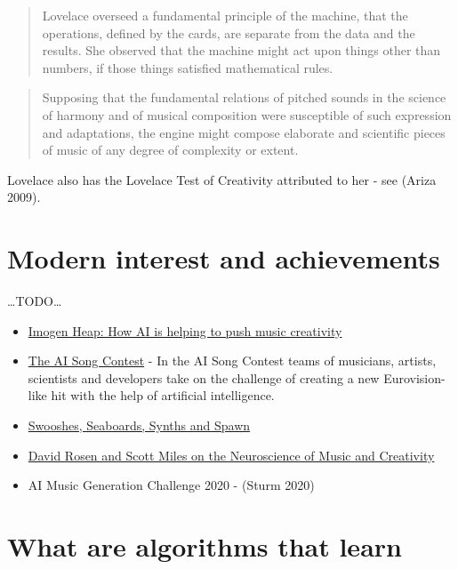 \documentclass[12pt,a4paper,]{report}
\providecommand{\tightlist}{%
  \setlength{\itemsep}{0pt}\setlength{\parskip}{0pt}}
\begin{document}
\begin{quote}
Lovelace overseed a fundamental principle of the machine, that the
operations, defined by the cards, are separate from the data and the
results. She observed that the machine might act upon things other than
numbers, if those things satisfied mathematical rules.
\end{quote}

\begin{quote}
Supposing that the fundamental relations of pitched sounds in the
science of harmony and of musical composition were susceptible of such
expression and adaptations, the engine might compose elaborate and
scientific pieces of music of any degree of complexity or extent.
\end{quote}

Lovelace also has the Lovelace Test of Creativity attributed to her -
see (Ariza 2009).

\hypertarget{modern-interest-and-achievements}{%
\section{Modern interest and
achievements}\label{modern-interest-and-achievements}}

\ldots TODO\ldots{}

\begin{itemize}
\tightlist
\item
  \href{https://www.bbc.co.uk/news/av/technology-52236563}{Imogen Heap:
  How AI is helping to push music creativity}
\item
  \href{https://www.vprobroadcast.com/titles/ai-songcontest.html}{The AI
  Song Contest} - In the AI \hspace{0pt}\hspace{0pt}Song Contest teams
  of musicians, artists, scientists and developers take on the challenge
  of creating a new Eurovision-like hit with the help of artificial
  intelligence.
\item
  \href{https://www.bbc.co.uk/programmes/m000cngg}{Swooshes, Seaboards,
  Synths and Spawn}
\item
  \href{https://overcast.fm/+S_7no2kwM}{David Rosen and Scott Miles on
  the Neuroscience of Music and Creativity}
\item
  AI Music Generation Challenge 2020 - (Sturm 2020)
\end{itemize}

\hypertarget{what-are-algorithms-that-learn}{%
\section{What are algorithms that
learn}\label{what-are-algorithms-that-learn}}
\end{document}
